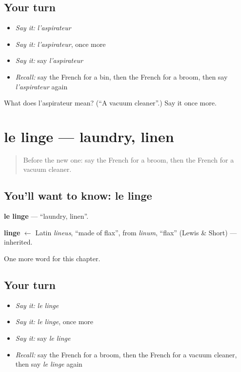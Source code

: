 \subsection*{Your turn}
\begin{itemize}
\raggedright
  \item \emph{Say it:} \emph{l'aspirateur}
  \item \emph{Say it:} \emph{l'aspirateur}, once more
  \item \emph{Say it:} say \emph{l'aspirateur}
  \item \emph{Recall:} say the French for a bin, then the French for a broom, then say \emph{l'aspirateur} again
\end{itemize}

\begin{tcolorbox}[breakable,colback=teal!4,colframe=teal!35!black,title={Before you move on}]
What does l'aspirateur mean? (\textquotedblleft{}A vacuum cleaner\textquotedblright{}.) Say it once more.
\end{tcolorbox}
\section[le linge]{le linge — laundry, linen}

\label{lesson:FR-C115-linge}



\begin{quote}
Before the new one: say the French for a broom, then the French for a vacuum cleaner.
\end{quote}

\subsection*{You'll want to know: le linge}
\textbf{le linge} — \textquotedblleft{}laundry, linen\textquotedblright{}.

\begin{cousinweb}
\textbf{linge} $\leftarrow$ Latin \emph{lineus}, \textquotedblleft{}made of flax\textquotedblright{}, from \emph{linum}, \textquotedblleft{}flax\textquotedblright{} (Lewis \& Short) — inherited.
\end{cousinweb}

\begin{grammarlens}[title={What you've built}]
One more word for this chapter.
\end{grammarlens}

\subsection*{Your turn}
\begin{itemize}
\raggedright
  \item \emph{Say it:} \emph{le linge}
  \item \emph{Say it:} \emph{le linge}, once more
  \item \emph{Say it:} say \emph{le linge}
  \item \emph{Recall:} say the French for a broom, then the French for a vacuum cleaner, then say \emph{le linge} again
\end{itemize}

